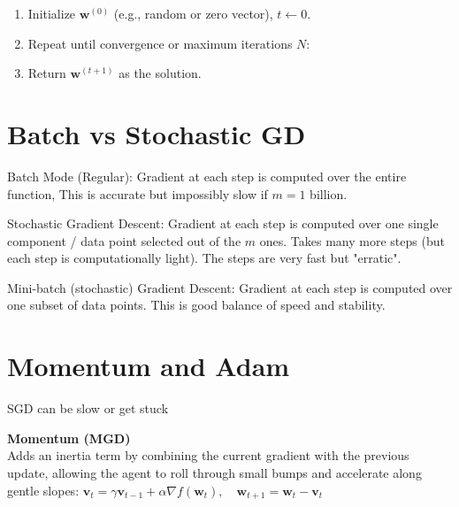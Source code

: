 \begin{enumerate}[label=\arabic*.]
    \item Initialize $\mathbf{w}^{(0)}$ (e.g., random or zero vector), $t \gets 0$.
    \item Repeat until convergence or maximum iterations $N$:
    \item Return $\mathbf{w}^{(t+1)}$ as the solution.
\end{enumerate}

\section*{Batch vs Stochastic GD}

\begin{tightitemize}
    \item Batch Mode (Regular): Gradient at each step is computed over the entire function,
    This is accurate but impossibly slow if $m = 1$ billion.
    \item Stochastic Gradient Descent: Gradient at each step is
    computed over one single component / data point selected out of the $m$ ones.
    Takes many more steps (but each step is computationally light). The steps are very fast but "erratic".
    \item Mini-batch (stochastic) Gradient Descent: Gradient at each step is computed
    over one subset of data points. This is good balance of speed and stability.
\end{tightitemize}

\section*{Momentum and Adam}

SGD can be slow or get stuck

\textbf{Momentum (MGD)}\\
Adds an inertia term by combining the current gradient with the previous update, allowing the agent to roll through small bumps and accelerate along gentle slopes:
$
\mathbf{v}_t = \gamma \mathbf{v}_{t-1} + \alpha \nabla f(\mathbf{w}_t), \quad
\mathbf{w}_{t+1} = \mathbf{w}_t - \mathbf{v}_t
$

